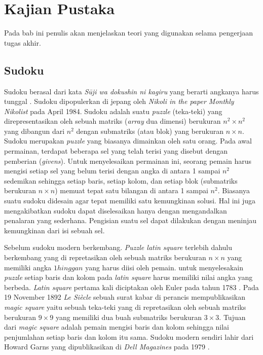 \chapter{Kajian Pustaka}

Pada bab ini penulis akan menjelaskan teori yang digunakan selama pengerjaan tugas akhir.

\section{Sudoku}

Sudoku berasal dari kata \textit{Sūji wa dokushin ni kagiru} yang berarti angkanya harus tunggal \cite{SATPy3}. Sudoku dipopulerkan di jepang oleh \textit{Nikoli in the paper Monthly Nikolist} pada April 1984. Sudoku adalah suatu \textit{puzzle} (teka-teki) yang direpresentasikan oleh sebuah matriks (\textit{array}
dua dimensi) berukuran ${n^2 \times n^2}$  yang dibangun dari ${n^2}$ dengan submatriks (atau blok)
yang berukuran ${n \times n}$. Sudoku merupakan \textit{puzzle}
yang biasanya dimainkan oleh satu orang.  Pada
awal permainan, terdapat beberapa sel yang telah terisi yang disebut dengan pemberian
(\textit{givens}). Untuk menyelesaikan permainan ini, seorang pemain harus mengisi setiap sel yang
belum terisi dengan angka di antara 1 sampai
$n^2$ sedemikan sehingga setiap baris, setiap kolom,
dan setiap blok (submatriks berukuran $n \times n$) memuat tepat satu bilangan di antara 1 sampai $n^2$. Biasanya suatu sudoku didesain agar tepat memiliki satu kemungkinan solusi. Hal
ini juga mengakibatkan sudoku dapat diselesaikan hanya dengan mengandalkan penalaran
yang sederhana. Pengisian suatu sel dapat dilakukan dengan meninjau kemungkinan dari
isi sebuah sel.

Sebelum sudoku modern berkembang. \textit{Puzzle latin square} terlebih dahulu berkembang yang di repretasikan oleh sebuah matriks berukuran ${n \times n}$ yang memiliki angka ${1 hingga n}$ yang harus diisi oleh pemain. untuk menyelesakain \textit{puzzle }setiap baris dan kolom pada \textit{latin square} harus memiliki nilai angka yang berbeda. \textit{Latin square} pertama kali diciptakan oleh Euler pada tahun 1783 \cite{Unk1}. Pada 19 November 1892 \textit{ Le Siècle} sebuah surat kabar di perancis mempublikasikan \textit{magic square} yaitu sebuah teka-teki  yang di repretasikan oleh sebuah matriks berukuran ${9 \times 9}$ yang memiliki dua buah submatriks berukuran ${3 \times 3}$. Tujuan dari \textit{magic square} adalah pemain mengisi baris dan kolom sehingga nilai penjumlahan setiap baris dan kolom itu sama. Sudoku modern sendiri lahir dari  Howard Garns yang dipublikasikan di \textit{Dell Magazines} pada 1979 \cite{SATPy5}.	


